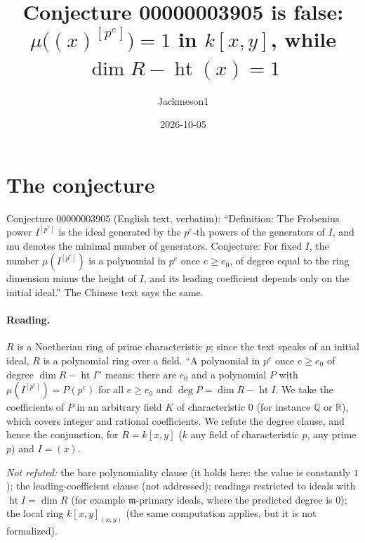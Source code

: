 \documentclass[11pt]{article}
\title{Conjecture 00000003905 is false:\\ $\mu\bigl((x)^{[p^e]}\bigr)=1$ in $k[x,y]$, while $\dim R-\operatorname{ht}(x)=1$}
\author{Jackmeson1}
\date{2026-10-05}
\theoremstyle{definition}
\begin{document}
\maketitle

\section{The conjecture}
Conjecture 00000003905 (English text, verbatim): ``Definition: The Frobenius power $I^{[p^e]}$ is
the ideal generated by the $p^e$-th powers of the generators of $I$, and mu denotes the minimal number
of generators. Conjecture: For fixed $I$, the number $\mu(I^{[p^e]})$ is a polynomial in $p^e$ once
$e \ge e_0$, of degree equal to the ring dimension minus the height of $I$, and its leading
coefficient depends only on the initial ideal.'' The Chinese text says the same.

\paragraph{Reading.} $R$ is a Noetherian ring of prime characteristic $p$; since the text speaks of an
initial ideal, $R$ is a polynomial ring over a field. ``A polynomial in $p^e$ once $e\ge e_0$ of degree
$\dim R-\operatorname{ht} I$'' means: there are $e_0$ and a polynomial $P$ with
$\mu(I^{[p^e]})=P(p^e)$ for all $e\ge e_0$ and $\deg P=\dim R-\operatorname{ht}I$. We take the
coefficients of $P$ in an arbitrary field $K$ of characteristic $0$ (for instance $\mathbb Q$ or
$\mathbb R$), which covers integer and rational coefficients. We refute the degree clause, and hence
the conjunction, for $R=k[x,y]$ ($k$ any field of characteristic $p$, any prime $p$) and $I=(x)$.

\emph{Not refuted:} the bare polynomiality clause (it holds here: the value is constantly $1$); the
leading-coefficient clause (not addressed); readings restricted to ideals with
$\operatorname{ht} I=\dim R$ (for example $\mathfrak m$-primary ideals, where the predicted degree is
$0$); the local ring $k[x,y]_{(x,y)}$ (the same computation applies, but it is not formalized).
\end{document}
